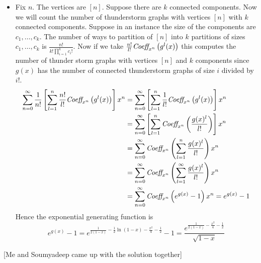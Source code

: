 \documentclass[a4paper, 11pt]{article}
\begin{document}
{\begin{itemize}[label=$\bullet$]
	 Hence there are total $\frac{n!}{2}+\frac{(n-1)!}2$ many thunderstorm graphs for $n\geq 3$. Now for $n=1,2$ there is only one graph is possible which is a path. Now define $a_n\coloneqq$ number of thunderstorm graphs on the vertex set $[n]$ for all $n\in\bbN$, $n\geq 3$. For $n=1,2$ we have $a_1=1=a_2$. For $n=0$ we have no graphs so $a_0=0$. So the exponential generating function, $g(x)$ is  
	\begin{align*}
\sum_{i=0}^{\infty}a_n\frac{x^n}{n!}&=\sum_{i=1}^{\infty}a_n\frac{x^n}{n!}\\
 &=x+\frac{x^2}{2!}+\sum_{n=3}^{\infty}\lt[\frac{n!}2+\frac{(n-1)!}{2}\rt]\frac{x^n}{n!}\\
 & =x+\frac{x^2}{2!}+\frac12\sum_{n=3}^{\infty}x^n+\frac12\sum_{n=3}^{\infty}\frac{x^n}{n}\\
 & = \frac{x}2-\frac12+\frac12\lt[\sum_{n=0}^{\infty}x^n\rt]+\frac12\lt[  \sum_{n=1}^{\infty}\frac{x^n}{n}   \rt]-\frac{x}2-\frac{x^2}{4}\\
 & = \frac1{2(1-x)}-\frac12\ln(1-x)-\frac{x^2}{4}-\frac12 & \lt[\int\frac{dx}{1-x}=\sum_{n=0}^{\infty}\int{x^n}dx=\sum_{n=1}^{\infty}\frac{x^n}{n}\rt]
	\end{align*}
	\item Fix $n$. The vertices are $[n]$. Suppose there are $k$ connected components. Now we will count the number of thunderstorm graphs with vertices $[n]$ with $k$ connected components. Suppose in an instance the size of the components are $c_1,\dots, c_k$. The number of ways to partition of $[n]$ into $k$ partitions of sizes $c_1,\dots, c_k$ is $\frac{n!}{k!\prod\limits_{i=1}^k c_i!}$. Now if we take $\frac{n!}{l!}   \textit{Coeff}_{x^n}\left(g^l(x)\right)$ this computes the number of thunder storm graphs with vertices $[n]$ and $k$ components since $g(x)$ has the number of connected thunderstorm graphs of size $i$ divided by $i!$.
	\begin{align*}
		\sum_{n=0}^{\infty}\frac1{n!}\left[\sum_{l=1}^{n}\frac{n!}{l!}   \textit{Coeff}_{x^n}\left(g^l(x)\right)\right]x^n&= 	\sum_{n=0}^{\infty}\left[\sum_{l=1}^{n}\frac1{l!}   \textit{Coeff}_{x^n}\left(g^l(x)\right)\right]x^n\\
	& = 	\sum_{n=0}^{\infty}\left[\sum_{l=1}^{n} \textit{Coeff}_{x^n}\left(\frac{g(x)^l}{l!}\right)\right]x^n\\
		& = 	\sum_{n=0}^{\infty} \textit{Coeff}_{x^n}\left(\sum_{l=1}^{n}\frac{g(x)^l}{l!}\right)x^n\\
		& = 	\sum_{n=0}^{\infty} \textit{Coeff}_{x^n}\left(\sum_{l=1}^{\infty}\frac{g(x)^l}{l!}\right)x^n\\
		& = 	\sum_{n=0}^{\infty} \textit{Coeff}_{x^n}\left(e^{g(x)}-1\right)x^n = e^{g(x)}-1
	\end{align*}Hence the exponential generating function is $$e^{g(x)}-1=e^{\frac1{2(1-x)}-\frac12\ln(1-x)-\frac{x^2}{4}-\frac12 }-1=\frac{e^{\frac1{2(1-x)}-\frac{x^2}{4}-\frac12 }}{\sqrt{1-x}}$$
\end{itemize}
}\parinf

[Me and Soumyadeep came up with the solution together]\parinn
\end{document}

